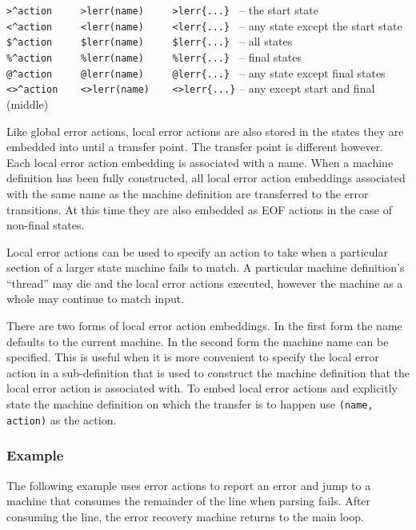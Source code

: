 \documentclass[letterpaper,11pt,oneside]{book}
\begin{document}
\sasp\verb|>^action     >lerr(name)     >lerr{...} | -- the start state\\
\sasp\verb|<^action     <lerr(name)     <lerr{...} | -- any state except the start state\\
\sasp\verb|$^action     $lerr(name)     $lerr{...} | -- all states\\
\sasp\verb|%^action     %lerr(name)     %lerr{...} | -- final states\\
\sasp\verb|@^action     @lerr(name)     @lerr{...} | -- any state except final states\\
\sasp\verb|<>^action    <>lerr(name)    <>lerr{...}| -- any except start and final (middle)
\vspace{12pt}

Like global error actions, local error actions are also stored in the states
they are embedded into until a transfer point. The transfer point is different
however. Each local error action embedding is associated with a name. When a
machine definition has been fully constructed, all local error action
embeddings associated with the same name as the machine definition are
transferred to the error transitions. At this time they are also embedded as
EOF actions in the case of non-final states.

Local error actions can be used to specify an action to take when a particular
section of a larger state machine fails to match. A particular machine
definition's ``thread'' may die and the local error actions executed, however
the machine as a whole may continue to match input.

There are two forms of local error action embeddings. In the first form the
name defaults to the current machine. In the second form the machine name can
be specified.  This is useful when it is more convenient to specify the local
error action in a sub-definition that is used to construct the machine
definition that the local error action is associated with. To embed local 
error actions and
explicitly state the machine definition on which the transfer is to happen use
\verb|(name, action)| as the action.

\subsubsection{Example}

The following example uses error actions to report an error and jump to a
machine that consumes the remainder of the line when parsing fails. After
consuming the line, the error recovery machine returns to the main loop.
\end{document}
